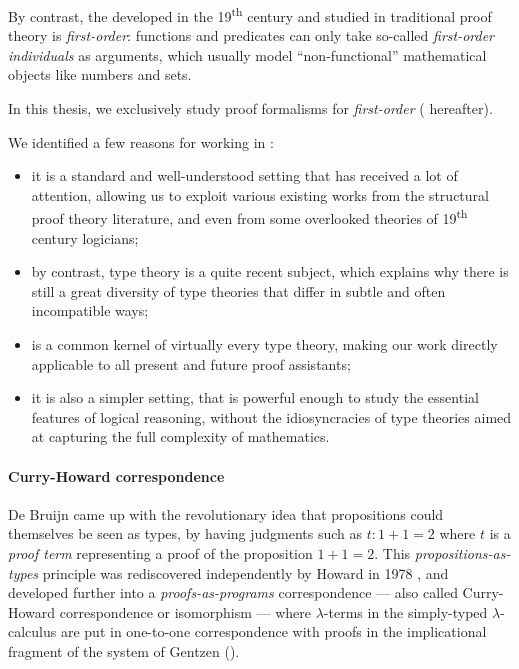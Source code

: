 By contrast, the  developed in the 19\textsuperscript{th} century
and studied in traditional proof theory is \emph{first-order}: functions and
predicates can only take so-called \emph{first-order individuals} as arguments,
which usually model ``non-functional'' mathematical objects like numbers and
sets.

\begin{emphpar}
In this thesis, we exclusively study proof formalisms for \emph{first-order}
 ( hereafter).
\end{emphpar}

We identified a few reasons for working in :
\begin{itemize}
  \item it is a standard and well-understood setting that has received a lot of
  attention, allowing us to exploit various existing works from the structural
  proof theory literature, and even from some overlooked theories of
  19\textsuperscript{th} century logicians;
  \item by contrast, type theory is a quite recent subject, which explains why there is still a
  great diversity of type theories that differ in subtle and often incompatible
  ways;
  \item {} is a common kernel of virtually every type theory, making our work
  directly applicable to all present and future proof assistants;
  \item it is also a simpler setting, that is powerful enough to study the
  essential features of logical reasoning, without the idiosyncracies of type
  theories aimed at capturing the full complexity of mathematics.
\end{itemize}

\paragraph{Curry-Howard correspondence}

De Bruijn came up with the revolutionary idea that propositions could themselves
be seen as types, by having judgments such as $t : 1 + 1 = 2$ where $t$ is a
\emph{proof term} representing a proof of the proposition $1 + 1 = 2$. This
\emph{propositions-as-types} principle was rediscovered independently by Howard
in 1978 , and developed further into a
\emph{proofs-as-programs} correspondence --- also called Curry-Howard
correspondence or isomorphism --- where
$\lambda$-terms in the simply-typed $\lambda$-calculus are put in one-to-one
correspondence with proofs in the implicational fragment of the  system  of Gentzen ().

